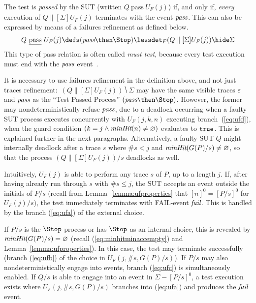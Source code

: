 \documentclass[3p,times]{elsarticle}
\newcommand{\ist}{\mbox{{\tt true}}}
\newcommand{\epass}{{\text{\it pass}}}
\newcommand{\efail}{{\text{\it fail}}}
\newcommand{\pass}{\underline{\text{pass}}}
\newcommand{\minhits}{\text{\it minHit}}
\begin{document}
The test is \emph{passed} by the SUT (written $Q\ \pass\ U_F(j)$) if, and
only if, {\it every} execution of $Q\parallel[\Sigma] U_F(j)$ terminates with
the event $\epass$. This can also be  expressed by means of a failures
refinement as defined below.
%
\begin{equation}
\label{eq:passF}
Q\ \pass\ U_F(j) \defs (\epass\then\Stop) \lessdet_F (Q\parallel[\Sigma] U_F(j)) \hide \Sigma
\end{equation}
%
This type of pass relation is often called \emph{must test}, because every
test execution must end with the $\epass$
event~\cite{Hennessy:1988:ATP:50497}.

It is necessary to use failures refinement in the definition above, and not
just traces refinement:~$(Q\parallel[\Sigma] U_F(j)) \hide \Sigma$ may have
the same visible traces $\varepsilon$ and $\epass$ as the ``Test Passed
Process'' $(\epass\then\Stop)$. However, the former may nondeterministically
refuse $\epass$, due to a deadlock occurring when a faulty SUT process
executes concurrently with $U_F(j,k,n)$ executing branch~(\ref{eq:ufd}), when
the guard condition $(k = j\wedge \minhits(n)\neq\varnothing)$ evaluates to
$\ist$. This is explained further in the next paragraphs. Alternatively, a
faulty SUT $Q$ might internally deadlock after a trace $s$ where $\#s < j$
and $\minhits(G(P)/s) \neq \varnothing$, so that the process
$(Q\parallel[\Sigma] U_F(j))/s$ deadlocks as well.

Intuitively, $U_F(j)$ is able to perform any trace $s$ of $P$, up to a length
$j$. If, after having already run through $s$ with $\#s \le j$, the SUT
accepts an event outside the initials of $P/s$
 (recall from Lemma~\ref{lemma:ufproperties} that $[n]^0 = [P/s]^0$ for $U_F(j)/s$),
the test immediately terminates with FAIL-event $\efail$. This is handled by
the branch (\ref{eq:ufa}) of the external choice. %

If $P/s$ is the $\Stop$ process or has $\Stop$ as an internal choice, this is
revealed by $\minhits(G(P)/s) = \varnothing$ (recall
(\ref{eq:minhitminaccempty}) and Lemma~\ref{lemma:ufproperties}). In this
case, the test may terminate successfully (branch (\ref{eq:ufb}) of the
choice in $U_F(j,\#s,G(P)/s)$). If $P/s$ may also nondeterministically engage
into events, branch (\ref{eq:ufc}) is simultaneously enabled. If $Q/s$ is
able to engage into an event in $\Sigma - [P/s]^0$, a test execution exists
where $U_F(j,\#s,G(P)/s)$ branches into (\ref{eq:ufa}) and produces the
$\efail$ event.
\end{document}
